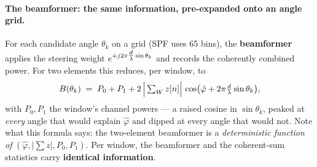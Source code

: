 \paragraph{The beamformer: the same information, pre-expanded onto an angle
grid.}
For each candidate angle $\theta_k$ on a grid (SPF uses 65 bins), the
\textbf{beamformer} applies the steering weight
$e^{+j2\pi \tfrac{d}{\lambda} \sin\theta_k}$ and records the coherently combined power.
For two elements this reduces, per window, to
\[
B(\theta_k) \;=\; P_0 + P_1
   + 2\,\Big|\textstyle\sum_W z[n]\Big|\,
     \cos\!\big(\hat\varphi + 2\pi\tfrac{d}{\lambda}\sin\theta_k\big),
\]
with $P_0, P_1$ the window's channel powers --- a raised cosine in
$\sin\theta_k$, peaked at \emph{every} angle that would explain
$\hat\varphi$ and dipped at every angle that would not. Note what this
formula says: the two-element beamformer is a \emph{deterministic function
of} $(\hat\varphi, |\sum z|, P_0, P_1)$. Per window, the beamformer and the
coherent-sum statistics carry \textbf{identical information}.

